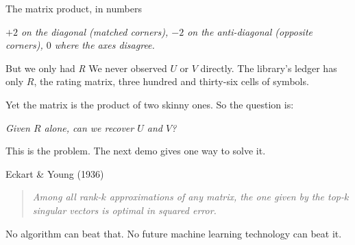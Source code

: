 \begin{frame}{The matrix product, in numbers}
  \smallskip
  \begin{center}
    \footnotesize\itshape\color{mutedWarmGray}
    $+2$ on the diagonal (matched corners),
    $-2$ on the anti-diagonal (opposite corners),
    $0$ where the axes disagree.
  \end{center}
\end{frame}

\begin{frame}{But we only had \emph{R}}
  \medskip
  We never observed $U$ or $V$ directly.  The library's ledger has only
  $R$, the rating matrix, three hundred and thirty-six cells of
  symbols.

  \medskip
  Yet the matrix is the product of two skinny ones.  So the question is:

  \vspace{1.6em}

  \begin{center}
    \itshape\large
    Given $R$ alone, can we recover $U$ and $V$?
  \end{center}

  \vspace{1.6em}

  This is the  problem.  The next demo
  gives one way to solve it.
\end{frame}


\begin{frame}{Eckart \& Young (1936)}
  \begin{quote}
    \itshape Among all rank-$k$ approximations of any matrix, the one
    given by the top-$k$ singular vectors is optimal in squared error.
  \end{quote}

  \vspace{0.8em}

  No algorithm can beat that.  No future machine learning technology
  can beat it.
\end{frame}

